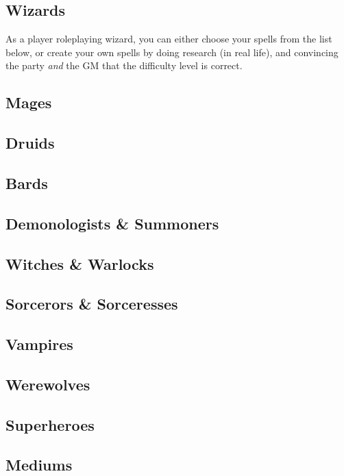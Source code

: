 \documentclass{LegrandOrangeTufteBook}
\newcommand{\termClass}[1]{\textcolor{xkcdBlueGreen}{#1}}
\begin{document}
\subsection*{Wizards}

As a player roleplaying \termClass{wizard}, you can either choose your spells from the list below,
or create your own spells by doing research (in real life), and convincing the party \emph{and} the GM
that the difficulty level is correct.

\subsection*{Mages}

\subsection*{Druids}

\subsection*{Bards}

\subsection*{Demonologists \& Summoners}

\subsection*{Witches \& Warlocks}

\subsection*{Sorcerors \& Sorceresses}

\subsection*{Vampires}

\subsection*{Werewolves}

\subsection*{Superheroes}

\subsection*{Mediums}
\end{document}
